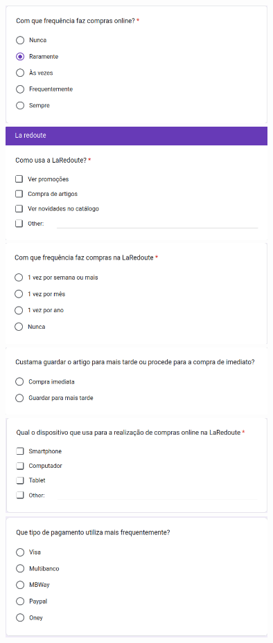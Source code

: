 \documentclass[a4paper,12pt]{article}
\begin{document}
\begin{center}
    \includegraphics[width=0.75\textwidth]{form/05questao_comprasonline.png}
    \includegraphics[width=0.75\textwidth]{form/06questao_usolaredoute.png}
    \includegraphics[width=0.75\textwidth]{form/07questao_frequencialaredoute.png}
    \includegraphics[width=0.75\textwidth]{form/08questao_guardarparatarde.png}
    \includegraphics[width=0.75\textwidth]{form/09questao_dispositivocompra.png}
    \includegraphics[width=0.75\textwidth]{form/10questao_metodopagamento.png}

\end{center}
\end{document}
